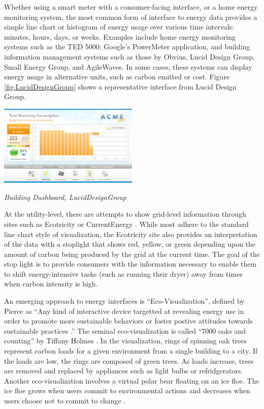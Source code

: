 Whether using a smart meter with a consumer-facing interface, or a home
energy monitoring system, the most common form of interface to energy data
provides a simple line chart or histogram of energy usage over various time
intervals: minutes, hours, days, or weeks.  Examples include home energy
monitoring systems such as the TED 5000; Google's PowerMeter application,
and building information management systems such as those by Obvius, Lucid
Design Group, Small Energy Group, and AgileWaves. In some cases, these
systems can display energy usage in alternative units, such as carbon
emitted or cost.  Figure \ref{fig:LucidDesignGroup} shows a representative
interface from Lucid Design Group.

\begin{floatingfigure}[l]{3.25in}
  \center
  \includegraphics[width=0.5\textwidth]{luciddesigngroup.3.eps}
  \caption{\em \small Building Dashboard, LucidDesignGroup}
  \label{fig:LucidDesignGroup}
\end{floatingfigure} 


At the utility-level, there are attempts to show grid-level information
through sites such as Ecotricity \cite{Ecotricity} or CurrentEnergy
\cite{CurrentEnergy}.  While most adhere to the standard line chart style
of visualization, the Ecotricity site also provides an interpretation of
the data with a stoplight that shows red, yellow, or green depending upon
the amount of carbon being produced by the grid at the current time.  The
goal of the stop light is to provide consumers with the information
necessary to enable them to shift energy-intensive tasks (such as running
their dryer) away from times when carbon intensity is high.

An emerging approach to energy interfaces is ``Eco-Visualization'',
defined by Pierce as ``Any kind of interactive device targetted at
revealing energy use in order to promote more sustainable behaviors or
foster postive attitudes towards sustainable practices \cite{Pierce08}.''
The seminal eco-visualization is called ``7000 oaks and counting'' by
Tiffany Holmes \cite{Holmes07}.  In the visualization, rings of spinning
oak trees represent carbon loads for a given environment from a single
building to a city.  If the loads are low, the rings are composed of green
trees. As loads increase, trees are removed and replaced by appliances such
as light bulbs or refridgerators.  Another eco-visualization involves a
virtual polar bear floating on an ice floe. The ice floe grows when users
commit to environmental actions and decreases when users choose not to
commit to change \cite{Dillahunt08}.

